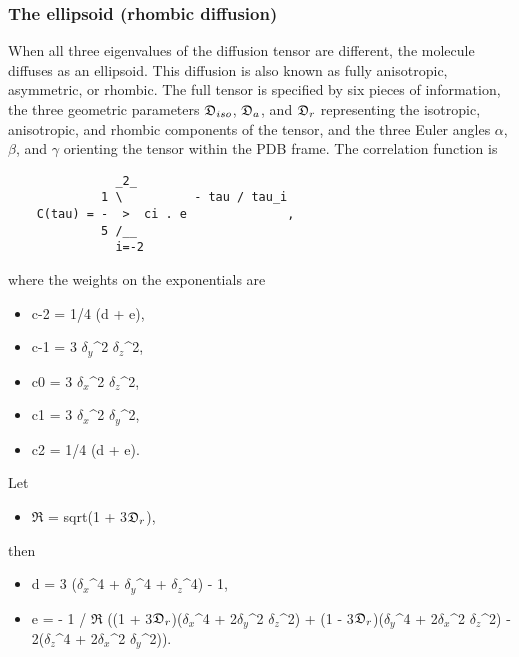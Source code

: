 \subsubsection{The ellipsoid (rhombic diffusion)}

When all three eigenvalues of the diffusion tensor are different, the molecule diffuses as an ellipsoid.  This diffusion is also known as fully anisotropic, asymmetric, or rhombic. The full tensor is specified by six pieces of information, the three geometric parameters $\mathfrak{D}_{iso}$, $\mathfrak{D}_a$, and $\mathfrak{D}_r$ representing the isotropic, anisotropic, and rhombic components of the tensor, and the three Euler angles $\alpha$, $\beta$, and $\gamma$ orienting the tensor within the PDB frame.  The correlation function is


{\footnotesize \begin{verbatim}
               _2_
             1 \          - tau / tau_i
    C(tau) = -  >  ci . e              ,
             5 /__
               i=-2
\end{verbatim}}

where the weights on the exponentials are


\begin{itemize}
\item[] c-2 = 1/4 (d + e), 
\item[] c-1 = 3 $\delta_y$\^{}2 $\delta_z$\^{}2, 
\item[] c0  = 3 $\delta_x$\^{}2 $\delta_z$\^{}2, 
\item[] c1  = 3 $\delta_x$\^{}2 $\delta_y$\^{}2, 
\item[] c2  = 1/4 (d + e). 
\end{itemize}


Let


\begin{itemize}
\item[] $\mathfrak{R}$ = sqrt(1 + 3$\mathfrak{D}_r$), 
\end{itemize}


then


\begin{itemize}
\item[] d = 3 ($\delta_x$\^{}4 + $\delta_y$\^{}4 + $\delta_z$\^{}4) - 1, 
\item[] e = - 1 / $\mathfrak{R}$ ((1 + 3$\mathfrak{D}_r$)($\delta_x$\^{}4 + 2$\delta_y$\^{}2 $\delta_z$\^{}2) + (1 - 3$\mathfrak{D}_r$)($\delta_y$\^{}4 + 2$\delta_x$\^{}2 $\delta_z$\^{}2) - 2($\delta_z$\^{}4 + 2$\delta_x$\^{}2 $\delta_y$\^{}2)). 
\end{itemize}


